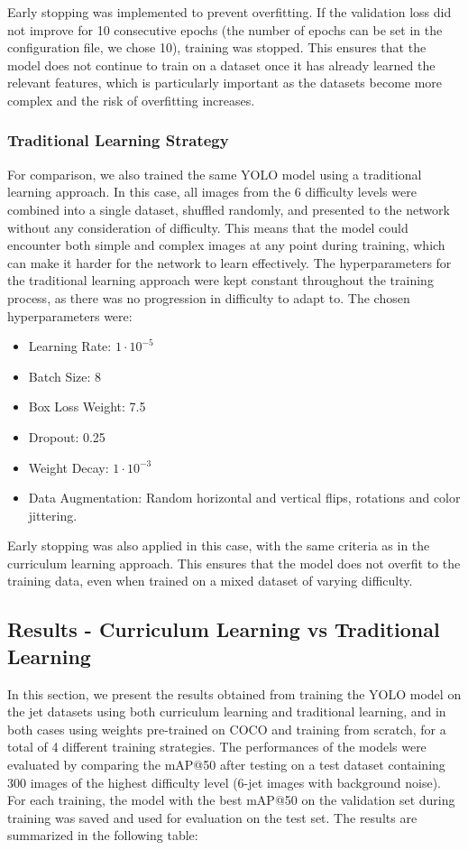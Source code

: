 Early stopping was implemented to prevent overfitting. If the validation loss did not improve for 10 consecutive epochs (the number of epochs can be set in the configuration file, we chose 10), training was stopped. This ensures that the model does not continue to train on a dataset once it has already learned the relevant features, which is particularly important as the datasets become more complex and the risk of overfitting increases.
\subsubsection*{Traditional Learning Strategy}
For comparison, we also trained the same YOLO model using a traditional learning approach. In this case, all images from the 6 difficulty levels were combined into a single dataset, shuffled randomly, and presented to the network without any consideration of difficulty. This means that the model could encounter both simple and complex images at any point during training, which can make it harder for the network to learn effectively.
The hyperparameters for the traditional learning approach were kept constant throughout the training process, as there was no progression in difficulty to adapt to. The chosen hyperparameters were:
\begin{itemize}
    \item Learning Rate: $1 \cdot 10^{-5}$
    \item Batch Size: 8
    \item Box Loss Weight: 7.5
    \item Dropout: 0.25
    \item Weight Decay: $1 \cdot 10^{-3}$
    \item Data Augmentation: Random horizontal and vertical flips, rotations and color jittering.
\end{itemize}
Early stopping was also applied in this case, with the same criteria as in the curriculum learning approach. This ensures that the model does not overfit to the training data, even when trained on a mixed dataset of varying difficulty.


\subsection*{Results - Curriculum Learning vs Traditional Learning}
In this section, we present the results obtained from training the YOLO model on the jet datasets using both curriculum learning and traditional learning, and in both cases using weights pre-trained on COCO and training from scratch, for a total of 4 different training strategies.
The performances of the models were evaluated by comparing the mAP@50 after testing on a test dataset containing 300 images of the highest difficulty level (6-jet images with background noise).
For each training, the model with the best mAP@50 on the validation set during training was saved and used for evaluation on the test set.
The results are summarized in the following table:


